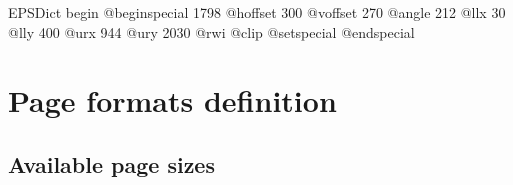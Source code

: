\documentclass[11pt]{article}
\def\nwendcode{\endtrivlist \endgroup} %
\let\nwdocspar=\par                    %
\newcommand{\sctn}[1]{\section{#1}}
\newcommand{\subsctn}[1]{\subsection{#1}}
\begin{document}
EPSDict begin
 @beginspecial
 1798 @hoffset 300 @voffset   %
 270 @angle                         %
 212 @llx 30 @lly 400 @urx 944 @ury %
 2030 @rwi
 @clip
 @setspecial
 @endspecial %

\nwendcode{}\nwdocspar


\begin{comment}
\end{comment}


% 
% 
% 

\newpage
\appendix


\sctn{Page formats definition}




\subsctn{Available page sizes}
\end{document}
